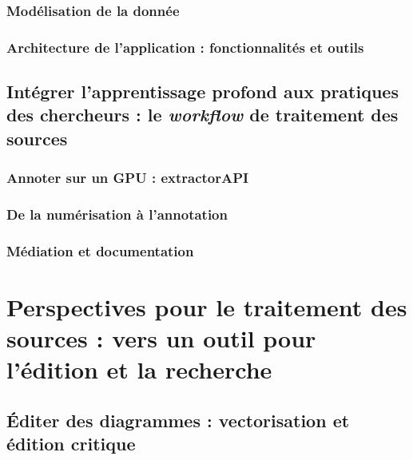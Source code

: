 \documentclass[a4paper,12pt,twoside]{book}
\newcommand{\clearemptydoublepage}{\newpage{\pagestyle{empty}\cleardoublepage}}
\begin{document}
                \section{Modélisation de la donnée}
                    
            
                \section{Architecture de l’application : fonctionnalités et outils}
                    
            
        \clearemptydoublepage
        
        \chapter{Intégrer l’apprentissage profond aux pratiques des chercheurs : le \textit{workflow} de traitement des sources}
                \section{Annoter sur un GPU : extractorAPI}
                    
            
                \section{De la numérisation à l’annotation}
                    
             
                \section{Médiation et documentation}
                    
            
        \clearemptydoublepage

    \part{Perspectives pour le traitement des sources : vers un outil pour l’édition et la recherche}
        \chapter{Éditer des diagrammes : vectorisation et édition critique}
\end{document}
